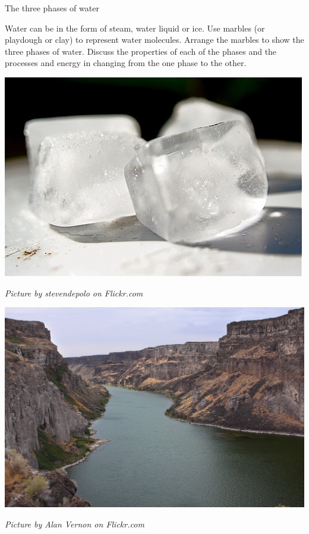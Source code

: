 \begin{activity}{The three phases of water}
\begin{minipage}{0.5\textwidth}
Water can be in the form of steam, water liquid or ice. Use marbles (or playdough or clay) to represent water molecules. Arrange the marbles to show the three phases of water. Discuss the properties of each of the phases and the processes and energy in changing from the one phase to the other. 
\end{minipage}
\begin{minipage}{.5\textwidth}
\begin{center}
 \includegraphics[width=.3\textwidth]{photos/iceby-stevendepolo-flickr.jpg}\par
\textit{Picture by stevendepolo on Flickr.com}
\end{center}
\begin{center}
 \includegraphics[width=.3\textwidth]{photos/AlanVernon.jpg}\par
\textit{Picture by Alan Vernon on Flickr.com}
\end{center}
\end{minipage}
\end{activity}

      
\label{m38730*cid7}
